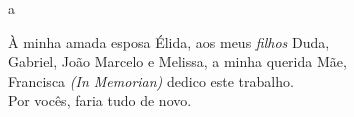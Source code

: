 a\documentclass[tcc]{ic}
\begin{document}

\capa

 \newpage
 \thispagestyle{empty}
 \mbox{}\vfill
 \begin{flushright}
 À minha amada esposa Élida, aos meus \emph{filhos} Duda, \\
 Gabriel, João Marcelo e Melissa, a minha querida Mãe,\\
 Francisca \textit{(In Memorian)} dedico este trabalho. \\
 Por vocês, faria tudo de novo.
 \end{flushright}

\end{document}
